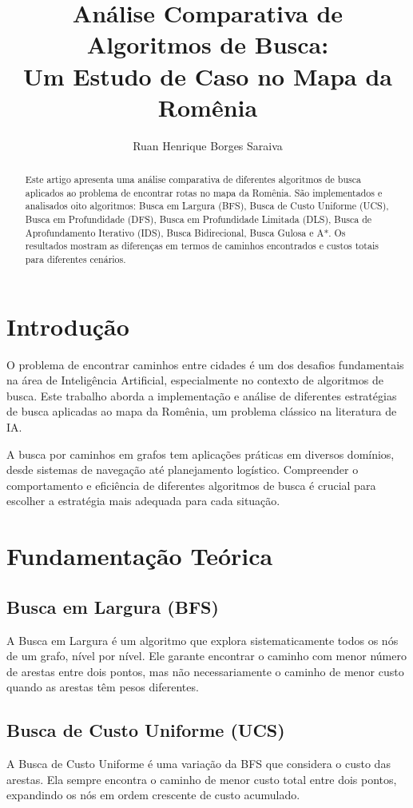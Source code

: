 \documentclass[12pt,a4paper]{article}
\title{Análise Comparativa de Algoritmos de Busca: \\Um Estudo de Caso no Mapa da Romênia}
\author{Ruan Henrique Borges Saraiva}
\begin{document}
\maketitle

\begin{abstract}
Este artigo apresenta uma análise comparativa de diferentes algoritmos de busca aplicados ao problema de encontrar rotas no mapa da Romênia. São implementados e analisados oito algoritmos: Busca em Largura (BFS), Busca de Custo Uniforme (UCS), Busca em Profundidade (DFS), Busca em Profundidade Limitada (DLS), Busca de Aprofundamento Iterativo (IDS), Busca Bidirecional, Busca Gulosa e A*. Os resultados mostram as diferenças em termos de caminhos encontrados e custos totais para diferentes cenários.
\end{abstract}

\section{Introdução}
O problema de encontrar caminhos entre cidades é um dos desafios fundamentais na área de Inteligência Artificial, especialmente no contexto de algoritmos de busca. Este trabalho aborda a implementação e análise de diferentes estratégias de busca aplicadas ao mapa da Romênia, um problema clássico na literatura de IA.

A busca por caminhos em grafos tem aplicações práticas em diversos domínios, desde sistemas de navegação até planejamento logístico. Compreender o comportamento e eficiência de diferentes algoritmos de busca é crucial para escolher a estratégia mais adequada para cada situação.

\section{Fundamentação Teórica}
\subsection{Busca em Largura (BFS)}
A Busca em Largura é um algoritmo que explora sistematicamente todos os nós de um grafo, nível por nível. Ele garante encontrar o caminho com menor número de arestas entre dois pontos, mas não necessariamente o caminho de menor custo quando as arestas têm pesos diferentes.

\subsection{Busca de Custo Uniforme (UCS)}
A Busca de Custo Uniforme é uma variação da BFS que considera o custo das arestas. Ela sempre encontra o caminho de menor custo total entre dois pontos, expandindo os nós em ordem crescente de custo acumulado.
\end{document}
